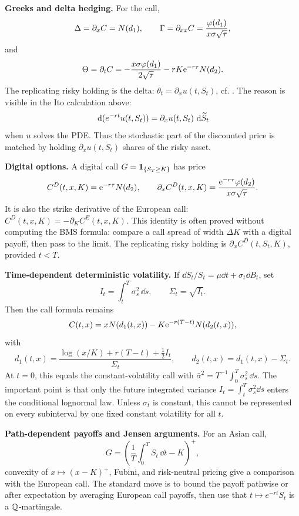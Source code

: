 \begin{techniques}
  \item \textbf{Greeks and delta hedging.}
  For the call,
  \[
    \Delta=\partial_xC=N(d_1),\qquad
    \Gamma=\partial_{xx}C=\frac{\varphi(d_1)}{x\sigma\sqrt{\tau}},
  \]
  and
  \[
    \Theta=\partial_tC
      =-\frac{x\sigma\varphi(d_1)}{2\sqrt{\tau}}
       -rK\mathrm{e}^{-r\tau}N(d_2).
  \]
  The replicating risky holding is the delta:
  \(\theta_t=\partial_xu(t,S_t)\), cf. .
  The reason is visible in the Ito calculation above:
  \[
    \,\mathrm{d}(e^{-rt}u(t,S_t))
      =\partial_xu(t,S_t)\,\,\mathrm{d}\widetilde S_t
  \]
  when \(u\) solves the PDE.  Thus the stochastic part of the discounted
  price is matched by holding \(\partial_xu(t,S_t)\) shares of the risky
  asset.

  \item \textbf{Digital options.}
  A digital call \(G=\mathbf{1}_{\{S_T\ge K\}}\) has price
  \[
    C^D(t,x,K)=\mathrm{e}^{-r\tau}N(d_2),
    \qquad
    \partial_xC^D(t,x,K)
      =\frac{\mathrm{e}^{-r\tau}\varphi(d_2)}{x\sigma\sqrt{\tau}}.
  \]
  It is also the strike derivative of the European call:
  \(C^D(t,x,K)=-\partial_K C^E(t,x,K)\).
  This identity is often proved without computing the BMS formula: compare a
  call spread of width \(\Delta K\) with a digital payoff, then pass to the
  limit.  The replicating risky holding is
  \(\partial_x C^D(t,S_t,K)\), provided \(t<T\).

  \item \textbf{Time-dependent deterministic volatility.}
  If \(\dd S_t/S_t=\mu\dd t+\sigma_t\dd B_t\), set
  \[
    I_t=\int_t^T\sigma_s^2\,\dd s,\qquad \Sigma_t=\sqrt{I_t}.
  \]
  Then the call formula remains
  \[
    C(t,x)=xN(d_1(t,x))-K\mathrm{e}^{-r(T-t)}N(d_2(t,x)),
  \]
  with
  \[
    d_1(t,x)=\frac{\log(x/K)+r(T-t)+\frac12 I_t}{\Sigma_t},
    \qquad
    d_2(t,x)=d_1(t,x)-\Sigma_t.
  \]
  At \(t=0\), this equals the constant-volatility call with
  \(\bar\sigma^2=T^{-1}\int_0^T\sigma_s^2\,\dd s\).
  The important point is that only the future integrated variance
  \(I_t=\int_t^T\sigma_s^2\dd s\) enters the conditional lognormal law.
  Unless \(\sigma_t\) is constant, this cannot be represented on every
  subinterval by one fixed constant volatility for all \(t\).

  \item \textbf{Path-dependent payoffs and Jensen arguments.}
  For an Asian call,
  \[
    G=\left(\frac1T\int_0^T S_t\,\dd t-K\right)^+,
  \]
  convexity of \(x\mapsto (x-K)^+\), Fubini, and risk-neutral pricing give a
  comparison with the European call.  The standard move is to bound the
  payoff pathwise or after expectation by averaging European call payoffs,
  then use that \(t\mapsto e^{-rt}S_t\) is a \(\mathbb{Q}\)-martingale.


\end{techniques}
